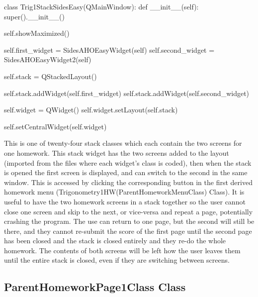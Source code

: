 \begin{python}
class Trig1StackSidesEasy(QMainWindow):
    def __init__(self):
        super().__init__()

        self.showMaximized()

        self.first_widget = SidesAHOEasyWidget(self)
        self.second_widget = SidesAHOEasyWidget2(self)

        self.stack = QStackedLayout()

        self.stack.addWidget(self.first_widget)
        self.stack.addWidget(self.second_widget)

        self.widget = QWidget()
        self.widget.setLayout(self.stack)

        self.setCentralWidget(self.widget)
\end{python}

This is one of twenty-four stack classes which each contain the two screens for one homework. This stack widget has the two screens added to the layout (imported from the files where each widget's class is coded), then when the stack is opened the first screen is displayed, and can switch to the second in the same window. This is accessed by clicking the corresponding button in the first derived homework menu (Trigonometry1HW(ParentHomeworkMenuClass) Class). It is useful to have the two homework screens in a stack together so the user cannot close one screen and skip to the next, or vice-versa and repeat a page, potentially crashing the program. The use can return to one page, but the second will still be there, and they cannot re-submit the score of the first page until the second page has been closed and the stack is closed entirely and they re-do the whole homework. The contents of both screens will be left how the user leaves them until the entire stack is closed, even if they are switching between screens.

\subsection{ParentHomeworkPage1Class Class}

